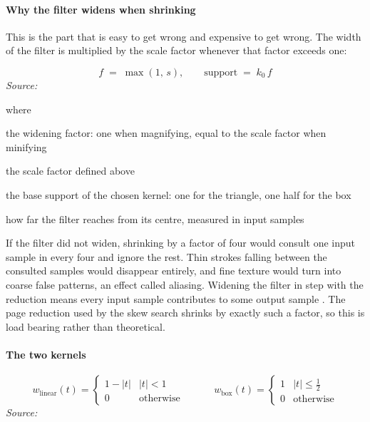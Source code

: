 \paragraph{Why the filter widens when shrinking}
This is the part that is easy to get wrong and expensive to get wrong. The width of the filter is multiplied by the scale factor whenever that factor exceeds one:


\begin{equation}
f \;=\; \max(1,\, s), \qquad \mathrm{support} \;=\; k_0\, f
\end{equation}
\noindent\emph{Source: }\cite{wolberg1990}


\noindent where
\begin{description}[leftmargin=2.4em,style=nextline,font=\normalfont\ttfamily]\setlength\itemsep{1pt}
  \item[{$f$}] \normalfont the widening factor: one when magnifying, equal to the scale factor when minifying
  \item[{$s$}] \normalfont the scale factor defined above
  \item[{$k_0$}] \normalfont the base support of the chosen kernel: one for the triangle, one half for the box
  \item[{$\mathrm{support}$}] \normalfont how far the filter reaches from its centre, measured in input samples
\end{description}
If the filter did not widen, shrinking by a factor of four would consult one input sample in every four and ignore the rest. Thin strokes falling between the consulted samples would disappear entirely, and fine texture would turn into coarse false patterns, an effect called aliasing. Widening the filter in step with the reduction means every input sample contributes to some output sample \cite{wolberg1990}. The page reduction used by the skew search shrinks by exactly such a factor, so this is load bearing rather than theoretical.


\paragraph{The two kernels}

\begin{equation}
w_{\mathrm{linear}}(t) = \begin{cases} 1 - |t| & |t| < 1 \\ 0 & \text{otherwise} \end{cases} \qquad\quad w_{\mathrm{box}}(t) = \begin{cases} 1 & |t| \le \tfrac{1}{2} \\ 0 & \text{otherwise} \end{cases}
\end{equation}
\noindent\emph{Source: }\cite{wolberg1990}


